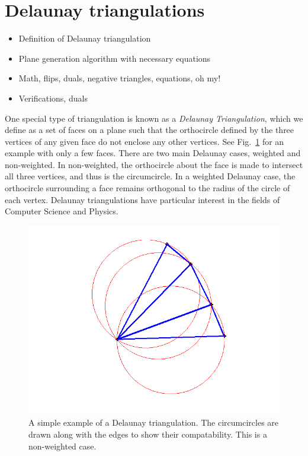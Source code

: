 \documentclass[12pt]{article}
\begin{document}
\section{Delaunay triangulations}
\label{DT}
\begin{itemize}
\item Definition of Delaunay triangulation
\item Plane generation algorithm with necessary equations
\item Math, flips, duals, negative triangles, equations, oh my!
\item Verifications, duals
\end{itemize}

\noindent One special type of triangulation is known as a \textit{Delaunay Triangulation}, which we define as a set of faces on a plane such that the orthocircle defined by the three vertices of any given face do not enclose any other vertices. See Fig.~\ref{genTri} for an example with only a few faces. There are two main Delaunay cases, weighted and non-weighted. In non-weighted, the orthocircle about the face is made to intersect all three vertices, and thus is the circumcircle. In a weighted Delaunay case, the orthocircle surrounding a face remains orthogonal to the radius of the circle of each vertex. Delaunay triangulations have particular interest in the fields of Computer Science and Physics.\newline

\begin{figure}
\centering
\includegraphics[scale = 0.6]{Pictures/genTri4.png}
\caption{A simple example of a Delaunay triangulation. The circumcircles are drawn along with the edges to show their compatability. This is a non-weighted case.}
\label{genTri}
\end{figure}
\end{document}
